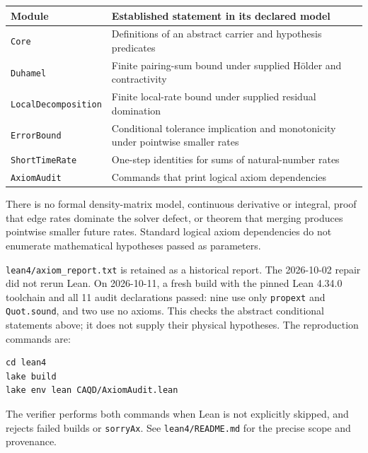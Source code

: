 \documentclass[
]{article}
\begin{document}
\begin{longtable}[]{@{}
  >{\raggedright\arraybackslash}p{}
  >{\raggedright\arraybackslash}p{}@{}}
\toprule\noalign{}
\begin{minipage}[b]{\linewidth}\raggedright
Module
\end{minipage} & \begin{minipage}[b]{\linewidth}\raggedright
Established statement in its declared model
\end{minipage} \\
\midrule\noalign{}
\endhead
\bottomrule\noalign{}
\endlastfoot
\texttt{Core} & Definitions of an abstract carrier and hypothesis predicates \\
\texttt{Duhamel} & Finite pairing-sum bound under supplied Hölder and contractivity \\
\texttt{LocalDecomposition} & Finite local-rate bound under supplied residual domination \\
\texttt{ErrorBound} & Conditional tolerance implication and monotonicity under pointwise smaller rates \\
\texttt{ShortTimeRate} & One-step identities for sums of natural-number rates \\
\texttt{AxiomAudit} & Commands that print logical axiom dependencies \\
\end{longtable}

There is no formal density-matrix model, continuous derivative or integral, proof that edge rates dominate the solver defect, or theorem that merging produces pointwise smaller future rates. Standard logical axiom dependencies do not enumerate mathematical hypotheses passed as parameters.

\texttt{lean4/axiom\_report.txt} is retained as a historical report. The 2026-10-02
repair did not rerun Lean. On 2026-10-11, a fresh build with the pinned Lean
4.34.0 toolchain and all 11 audit declarations passed: nine use only
\texttt{propext} and \texttt{Quot.sound}, and two use no axioms. This checks the abstract
conditional statements above; it does not supply their physical hypotheses.
The reproduction commands are:

\begin{verbatim}
cd lean4
lake build
lake env lean CAQD/AxiomAudit.lean
\end{verbatim}

The verifier performs both commands when Lean is not explicitly skipped, and rejects failed builds or \texttt{sorryAx}. See \texttt{lean4/README.md} for the precise scope and provenance.
\end{document}
